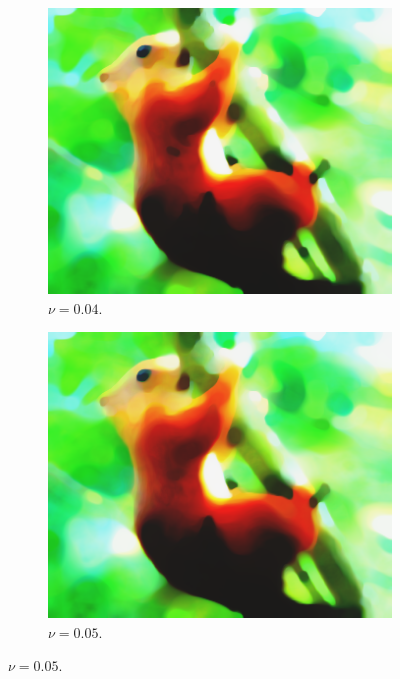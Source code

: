 \documentclass[abstracton]{scrreprt}
\begin{document}
\begin{figure}[!ht]
                \begin{subfigure}[b]{0.24\textwidth}
                    \includegraphics[width=\textwidth]{img/segmentation/cr/004squirrel.png}
                    \caption{$\nu = 0.04$.}
                \end{subfigure}
                \begin{subfigure}[b]{0.24\textwidth}
                    \includegraphics[width=\textwidth]{img/segmentation/cr/005squirrel.png}
                    \caption{$\nu = 0.05$.}
                \end{subfigure}

\end{figure}
\end{document}
